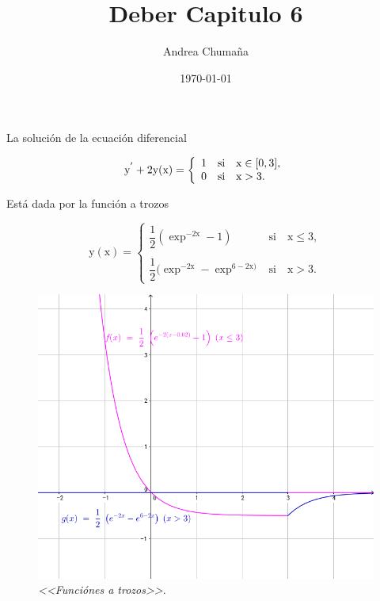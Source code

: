 \documentclass[a3paper, 12pt]{article}
\author{Andrea Chumaña}
\title{Deber Capitulo 6}
\date{\today}
\begin{document}
\maketitle
La solución de la ecuación diferencial
\begin{center}
  \begin{equation*}
\text{y}^{'} + 2\text{y}(\text{x})= \left\lbrace
\begin{array}{ll}
\text{1} & \text{si} \quad \text{x} \in [0,3],\\
\text{0} & \text{si} \quad \text{x} > 3.
\end{array}\\
\right.
\end{equation*}
\end{center}
{\color{magenta}Está dada} por la función a trozos 
\begin{center}
 \begin{equation*}
\text{y}(\text{x})= \left\lbrace
\begin{array}{ll}
\dfrac{1}{2}(\exp^{-2\text{x}}-1)& \text{si} \quad \text{x}\leq 3,\\
\\
\dfrac{1}{2}(\exp^{-2\text{x}}-\exp^{6-2\text{x})}& \text{si}  \quad \text{x} > 3.
\end{array}
\right.
\end{equation*}
\end{center}
\begin{figure}[h!] 
\centering 
\includegraphics [scale = 0.5]{grafico1}
\caption{ \emph{<<Funciónes a trozos>>}.}
\label{mec} 
\end{figure}
\end{document}
